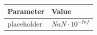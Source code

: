 \begin{tabular}{ll}
Parameter & Value\\ 
\hline 
placeholder & $NaN \cdot 10^{-Inf}$ \\ 
\end{tabular}